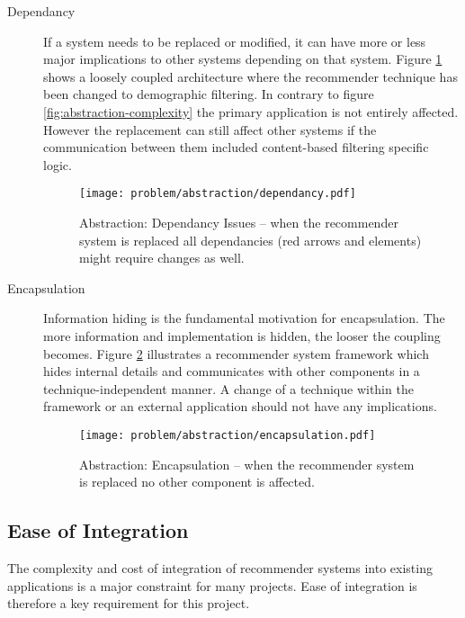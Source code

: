 \begin{description}
    \item[Dependancy] If a system needs to be replaced or modified, it can have more or less major implications to other systems depending on that system. Figure \ref{fig:abstraction-dependancy} shows a loosely coupled architecture where the recommender technique has been changed to demographic filtering. In contrary to figure \ref{fig:abstraction-complexity} the primary application is not entirely affected. However the replacement can still affect other systems if the communication between them included content-based filtering specific logic.

    \begin{figure}[H]
        \texttt{[image: problem/abstraction/dependancy.pdf]}
        \caption[Abstraction: Dependancy Issues]{Abstraction: Dependancy Issues -- when the recommender system is replaced all dependancies (red arrows and elements) might require changes as well.}
        \label{fig:abstraction-dependancy}
    \end{figure}

    \item[Encapsulation] Information hiding is the fundamental motivation for encapsulation. The more information and implementation is hidden, the looser the coupling becomes. Figure \ref{fig:abstraction-encapsulation} illustrates a recommender system framework which hides internal details and communicates with other components in a technique-independent manner. A change of a technique within the framework or an external application should not have any implications.

    \begin{figure}[H]
        \texttt{[image: problem/abstraction/encapsulation.pdf]}
        \caption[Abstraction: Encapsulation]{Abstraction: Encapsulation -- when the recommender system is replaced no other component is affected.}
        \label{fig:abstraction-encapsulation}
    \end{figure}
\end{description}

\subsection{Ease of Integration}

The complexity and cost of integration of recommender systems into existing applications is a major constraint for many projects. Ease of integration is therefore a key requirement for this project.